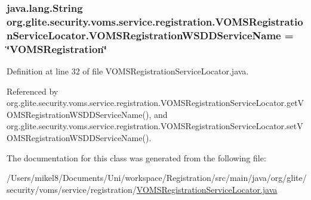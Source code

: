 \hypertarget{classorg_1_1glite_1_1security_1_1voms_1_1service_1_1registration_1_1VOMSRegistrationServiceLocator_a37abee409465b82c58014954c0b576e9}{
\subsubsection[{VOMSRegistrationWSDDServiceName}]{\setlength{\rightskip}{0pt plus 5cm}java.lang.String {\bf org.glite.security.voms.service.registration.VOMSRegistrationServiceLocator.VOMSRegistrationWSDDServiceName} = \char`\"{}VOMSRegistration\char`\"{}}}
\label{classorg_1_1glite_1_1security_1_1voms_1_1service_1_1registration_1_1VOMSRegistrationServiceLocator_a37abee409465b82c58014954c0b576e9}


Definition at line 32 of file VOMSRegistrationServiceLocator.java.



Referenced by org.glite.security.voms.service.registration.VOMSRegistrationServiceLocator.getVOMSRegistrationWSDDServiceName(), and org.glite.security.voms.service.registration.VOMSRegistrationServiceLocator.setVOMSRegistrationWSDDServiceName().



The documentation for this class was generated from the following file:\begin{DoxyCompactItemize}
\item 
/Users/mikel8/Documents/Uni/workspace/Registration/src/main/java/org/glite/security/voms/service/registration/\hyperlink{VOMSRegistrationServiceLocator_8java}{VOMSRegistrationServiceLocator.java}\end{DoxyCompactItemize}
